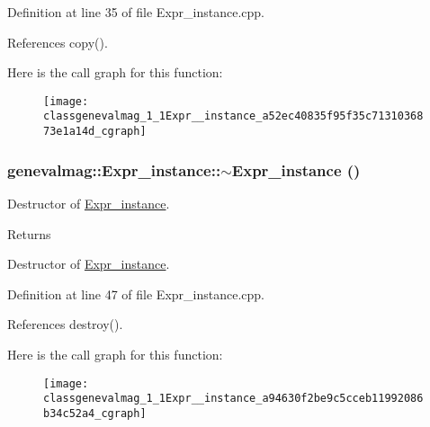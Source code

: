 Definition at line 35 of file Expr\_\-instance.cpp.



References copy().



Here is the call graph for this function:\nopagebreak
\begin{figure}[H]
\begin{center}
\leavevmode
\texttt{[image: classgenevalmag\_1\_1Expr\_\_instance\_a52ec40835f95f35c7131036873e1a14d\_cgraph]}
\end{center}
\end{figure}


\hypertarget{classgenevalmag_1_1Expr__instance_a94630f2be9c5cceb11992086b34c52a4}{
\subsubsection[{$\sim$Expr\_\-instance}]{\setlength{\rightskip}{0pt plus 5cm}genevalmag::Expr\_\-instance::$\sim$Expr\_\-instance ()}}
\label{classgenevalmag_1_1Expr__instance_a94630f2be9c5cceb11992086b34c52a4}
Destructor of \hyperlink{classgenevalmag_1_1Expr__instance}{Expr\_\-instance}. \begin{DoxyReturn}{Returns}

\end{DoxyReturn}
Destructor of \hyperlink{classgenevalmag_1_1Expr__instance}{Expr\_\-instance}. 

Definition at line 47 of file Expr\_\-instance.cpp.



References destroy().



Here is the call graph for this function:\nopagebreak
\begin{figure}[H]
\begin{center}
\leavevmode
\texttt{[image: classgenevalmag\_1\_1Expr\_\_instance\_a94630f2be9c5cceb11992086b34c52a4\_cgraph]}
\end{center}
\end{figure}




